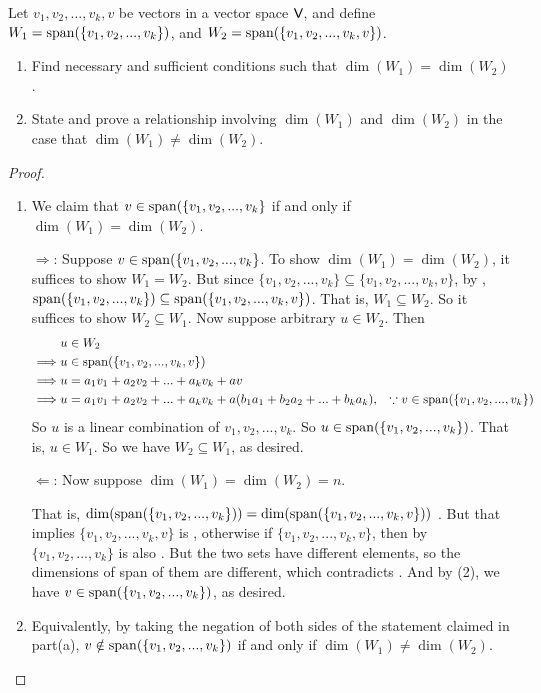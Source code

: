 \begin{exercise} \label{exercise 1.6.23}
\sloppy Let \(v_1, v_2, ..., v_k, v\) be vectors in a vector space \(\textsf{V}\), and define \(W_1 = \operatorname{span}(\{v_1, v_2, ..., v_k\})\), and \(W_2 = \operatorname{span}(\{ v_1, v_2, ..., v_k, v \})\).
\begin{enumerate}
\item Find necessary and sufficient conditions  such that \(\dim(W_1) = \dim(W_2)\).
\item State and prove a relationship involving \(\dim(W_1)\) and \(\dim(W_2)\) in the case that \(\dim(W_1) \ne \dim(W_2)\).
\end{enumerate}
\end{exercise}

\begin{proof}\ 

\begin{enumerate}
\item We claim that \(v \in \operatorname{span}(\{ v_1, v_2, ..., v_k \}\) if and only if \(\dim(W_1) = \dim(W_2)\).

\(\Longrightarrow\): Suppose \(v \in \operatorname{span}(\{ v_1, v_2, ..., v_k \}\).
To show \(\dim(W_1) = \dim(W_2)\), it suffices to show \(W_1 = W_2\).
But since \(\{ v_1, v_2, ..., v_k \} \subseteq \{ v_1, v_2, ..., v_k, v \}\), by , \(\operatorname{span}(\{ v_1, v_2, ..., v_k \}) \subseteq \operatorname{span}(\{ v_1, v_2, ..., v_k, v \})\).
That is, \(W_1 \subseteq W_2\).
So it suffices to show \(W_2 \subseteq W_1\).
Now suppose arbitrary \(u \in W_2\).
Then
\begin{align*}
             & u \in W_2 \\
    \implies & u \in \operatorname{span}(\{ v_1, v_2, ..., v_k, v \}) \\
    \implies & u = a_1 v_1 + a_2 v_2 + ... + a_k v_k + a v \\
    \implies & u = a_1 v_1 + a_2 v_2 + ... + a_k v_k + a (b_1 a_1 + b_2 a_2 + ... + b_k a_k), & \text{\(\because v \in \operatorname{span}(\{ v_1, v_2, ..., v_k \})\)}
\end{align*}
So \(u\) is a linear combination of \(v_1, v_2, ..., v_k\).
So \(u \in \operatorname{span}(\{ v_1, v_2, ..., v_k \})\).
That is, \(u \in W_1\).
So we have \(W_2 \subseteq W_1\), as desired.

\(\Longleftarrow\): Now suppose \(\dim(W_1) = \dim(W_2) = n\).

That is, \(\dim(\operatorname{span}(\{ v_1, v_2, ..., v_k \})) = \dim(\operatorname{span}(\{ v_1, v_2, ..., v_k, v \}))\) .
But that implies \(\{ v_1, v_2, ..., v_k, v \}\) is \LDP{}, otherwise if \(\{ v_1, v_2, ..., v_k, v \}\), then by  \(\{ v_1, v_2, ..., v_k \}\) is also \LID{}.
But the two sets have different elements, so the dimensions of span of them are different, which contradicts .
And by (2), we have \(v \in \operatorname{span}(\{ v_1, v_2, ..., v_k \})\), as desired.

\item Equivalently, by taking the negation of both sides of the statement claimed in part(a), \(v \notin \operatorname{span}(\{ v_1, v_2, ..., v_k \})\) if and only if \(\dim(W_1) \ne \dim(W_2)\).
\end{enumerate}
\end{proof}

